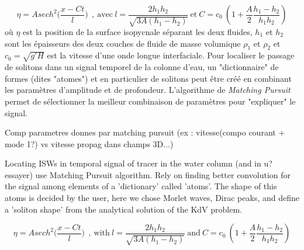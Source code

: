 \begin{equation}
\eta = A sech^2\bigg( \frac{x-Ct}{l} \bigg) \ \ , \ \text{avec} \ l = \frac{2h_1h_2}{\sqrt{3A(h_1-h_2)}} \ \text{et} \ C=c_0 \ (1 + \frac{A}{2} \frac{h_1-h_2}{h_1h_2})
\end{equation}
où $\eta$ est la position de la surface isopycnale séparant les deux fluides, $h_1$ et $h_2$ sont les épaisseurs des deux couches de fluide de masse volumique $\rho_1$ et $\rho_2$ et $c_0=\sqrt{g'H}$ est la vitesse d'une onde longue interfaciale.
Pour localiser le passage de solitons dans un signal temporel de la colonne d'eau, un "dictionnaire" de formes (dites "atomes") et en particulier de solitons peut être créé en combinant les paramètres d'amplitude et de profondeur. L'algorithme de \textit{Matching Pursuit} \citep{mallat_1993} permet de sélectionner la meilleur combinaison de paramètres pour "expliquer" le signal.\color{black}


Comp parametres donnes par matching pursuit (ex : vitesse(compo courant + mode 1?) vs vitesse propag dans champs 3D...)

Locating ISWs in temporal signal of tracer in the water column (and in u? essayer) use Matching Pursuit algorithm. Rely on finding better convolution for the signal among elements of a 'dictionary' called 'atoms'. The shape of this atoms is decided by the user, here we chose Morlet waves, Dirac peaks, and define a 'soliton shape' from the analytical solution of the KdV problem.

\begin{equation}
\eta = A sech^2\bigg( \frac{x-Ct}{l} \bigg) \ \ , \ \text{with} \ l = \frac{2h_1h_2}{\sqrt{3A(h_1-h_2)}} \ \text{and} \ C=c_0 \ (1 + \frac{A}{2} \frac{h_1-h_2}{h_1h_2})
\end{equation}





